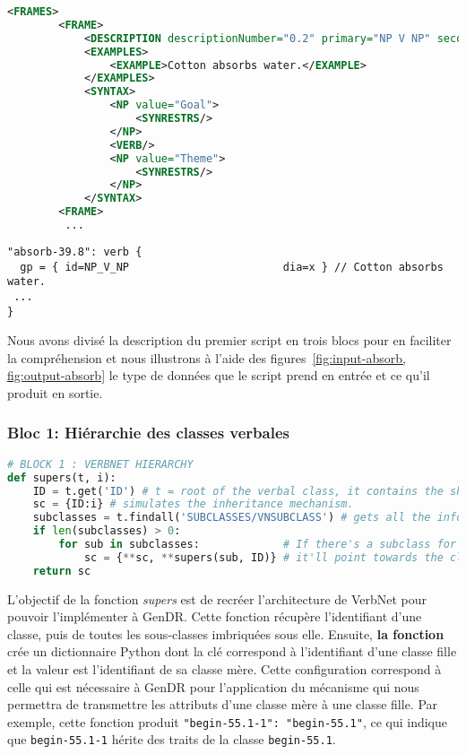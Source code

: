\begin{lstlisting}[language=XML, caption=Input du script: cadres syntaxique imbriqués dans les fichiers VerbNet, label=fig:input-absorb]
<FRAMES>
        <FRAME>
            <DESCRIPTION descriptionNumber="0.2" primary="NP V NP" secondary="Basic Transitive" xtag=""/>
            <EXAMPLES>
                <EXAMPLE>Cotton absorbs water.</EXAMPLE>
            </EXAMPLES>
            <SYNTAX>
                <NP value="Goal">
                    <SYNRESTRS/>
                </NP>
                <VERB/>
                <NP value="Theme">
                    <SYNRESTRS/>
                </NP>
            </SYNTAX>
		<FRAME>
         ...
\end{lstlisting}


\begin{lstlisting}[language=mate, caption=Output du script: propriétés de la classe verbale \texttt{absorb-39.8}, label=fig:output-absorb ]
"absorb-39.8": verb {
  gp = { id=NP_V_NP                        dia=x } // Cotton absorbs water.
 ...
}
\end{lstlisting}

Nous avons divisé la description du premier script en trois blocs pour en faciliter la compréhension et nous illustrons à l'aide des figures~\ref{fig:input-absorb, fig:output-absorb} le type de données que le script prend en entrée et ce qu'il produit en sortie.

\subsubsection{Bloc 1: Hiérarchie des classes verbales}

\begin{lstlisting}[language=Python, caption = Importation de l'architecture des classes verbales, label=fig:archivn-bloc1]
# BLOCK 1 : VERBNET HIERARCHY
def supers(t, i):
    ID = t.get('ID') # t = root of the verbal class, it contains the shared syntactic information.
    sc = {ID:i} # simulates the inheritance mechanism.
    subclasses = t.findall('SUBCLASSES/VNSUBCLASS') # gets all the information on the subclasses.
    if len(subclasses) > 0:
        for sub in subclasses:             # If there's a subclass for a given VNCLASS, 
            sc = {**sc, **supers(sub, ID)} # it'll point towards the class it's being dominated by.
    return sc
\end{lstlisting}

L'objectif de la fonction \emph{supers} est de recréer l'architecture de VerbNet pour pouvoir l'implémenter à GenDR. Cette fonction récupère l'identifiant d'une classe, puis de toutes les sous-classes imbriquées sous elle. Ensuite, \textbf{la fonction} crée un dictionnaire Python dont la clé correspond à l'identifiant d'une classe fille et la valeur est l'identifiant de sa classe mère. Cette configuration correspond à celle qui est nécessaire à GenDR pour l'application du mécanisme qui nous permettra de transmettre les attributs d'une classe mère à une classe fille. Par exemple, cette fonction produit \lstinline|"begin-55.1-1": "begin-55.1"|, ce qui indique que \texttt{begin-55.1-1} hérite des traits de la classe \texttt{begin-55.1}.

